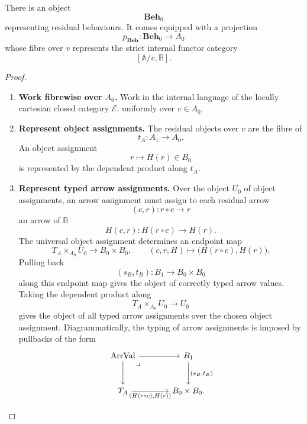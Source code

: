 \begin{theorem}
\label{thm:object-of-residual-behaviours}
    There is an object
    \[
        \mathbf{Beh}_0
    \]
    representing residual behaviours. It comes equipped with a projection
    \[
        p_{\mathbf{Beh}}:\mathbf{Beh}_0\to A_0
    \]
    whose fibre over \(v\) represents the strict internal functor category
    \[
        [\mathbb A/v,\mathbb B].
    \]
\end{theorem}
\begin{proof}
    \leavevmode
    \begin{enumerate}
        \item \textbf{Work fibrewise over \(A_0\).} Work in the internal language of the locally cartesian closed category \(\mathcal E\), uniformly over \(v\in A_0\).

        \item \textbf{Represent object assignments.} The residual objects over \(v\) are the fibre of
        \[
            t_A:A_1\to A_0.
        \]
        An object assignment
        \[
            r\longmapsto H(r)\in B_0
        \]
        is represented by the dependent product along \(t_A\).

        \item \textbf{Represent typed arrow assignments.} Over the object \(U_0\) of object assignments, an arrow assignment must assign to each residual arrow
        \[
            (c,r):r\circ c\to r
        \]
        an arrow of \(\mathbb B\)
        \[
            H(c,r):H(r\circ c)\to H(r).
        \]
        The universal object assignment determines an endpoint map
        \[
            T_A\times_{A_0}U_0
            \longrightarrow B_0\times B_0,
            \qquad
            (c,r,H)\longmapsto \bigl(H(r\circ c),H(r)\bigr).
        \]
        Pulling back
        \[
            (s_B,t_B):B_1\to B_0\times B_0
        \]
        along this endpoint map gives the object of correctly typed arrow values. Taking the dependent product along
        \[
            T_A\times_{A_0}U_0\to U_0
        \]
        gives the object of all typed arrow assignments over the chosen object assignment. Diagrammatically, the typing of arrow assignments is imposed by pullbacks of the form
        \[
            \begin{tikzcd}[column sep=large, row sep=large]
                \mathrm{ArrVal}
                    \arrow[r]
                    \arrow[d]
                    \arrow[dr, phantom, "\lrcorner", very near start]
                &
                    B_1
                        \arrow[d, "{(s_B,t_B)}"]
                \\
                    T_A
                        \arrow[r, "{(H(r\circ c),H(r))}"']
                &
                    B_0\times B_0.
            \end{tikzcd}
        \]


\end{enumerate}
\end{proof}
